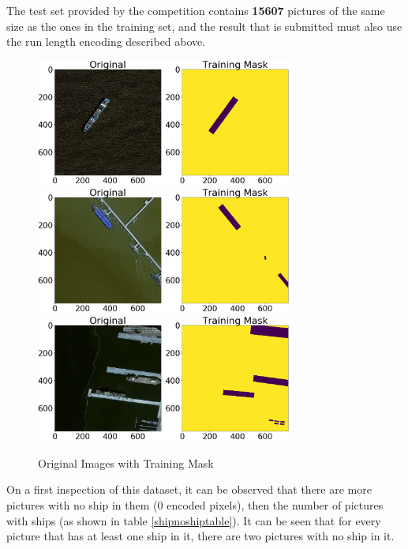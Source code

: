 The test set provided by the competition contains \textbf{15607} pictures of the same size as the ones in the training set, and the result that is submitted must also use the run length encoding described above.
\begin{figure}
	\centering
	\includegraphics[width=0.75\textwidth]{Pictures/015OrigMaskExample1.png} \\
	\includegraphics[width=0.75\textwidth]{Pictures/015OrigMaskExample2.png} \\
	\includegraphics[width=0.75\textwidth]{Pictures/015OrigMaskExample3.png} 
	\caption{Original Images with Training Mask}
	\label{OrigMask}
\end{figure}

On a first inspection of this dataset, it can be observed that there are more pictures with no ship in them (0 encoded pixels), then the number of pictures with ships (as shown in table \ref{shipnoshiptable}). It can be seen that for every picture that has at least one ship in it, there are two pictures with no ship in it.

